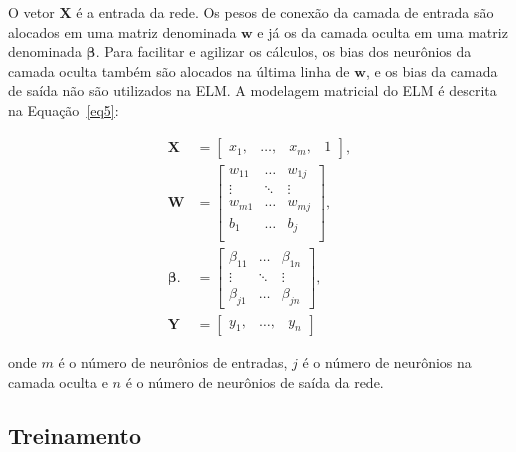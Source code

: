 O vetor \(\mathbf{X}\) é a entrada da rede. Os pesos de conexão da camada de entrada são alocados em uma matriz denominada \(\mathbf{w}\) e já os da camada oculta em uma matriz denominada \(\boldsymbol{\beta}\). Para facilitar e agilizar os cálculos, os bias dos neurônios da camada oculta também são alocados na última linha de \(\mathbf{w}\), e os bias da camada de saída não são utilizados na ELM. A modelagem matricial do ELM é descrita na Equação~\eqref{eq5}:

\begin{subequations} \label{eq5}
\begin{align}
        \boldsymbol{X} &= \begin{bmatrix}
                x_{1},      & \dots ,     & x_{m},    & 1
            \end{bmatrix}, \\
        \boldsymbol{W} &= \begin{bmatrix}
                w_{11}      & \dots     & w_{1j} \\
                \vdots      & \ddots    & \vdots \\
                w_{m1}      & \dots     & w_{mj} \\
                b_{1}      & \dots     & b_{j} \\
            \end{bmatrix}, \\
        \boldsymbol{\beta}. &= \begin{bmatrix}
                \beta_{11}      & \dots     & \beta_{1n} \\
                \vdots      & \ddots    & \vdots \\
                \beta_{j1}      & \dots     & \beta_{jn}
            \end{bmatrix}, \\
            \boldsymbol{Y} &= \begin{bmatrix}
                y_{1},      & \dots ,     & y_{n}
            \end{bmatrix}
\end{align}
\end{subequations}

onde \(m\) é o número de neurônios de entradas, \(j\) é o número de neurônios na camada oculta e \(n\) é o número de neurônios de saída da rede.

\subsection{Treinamento}

